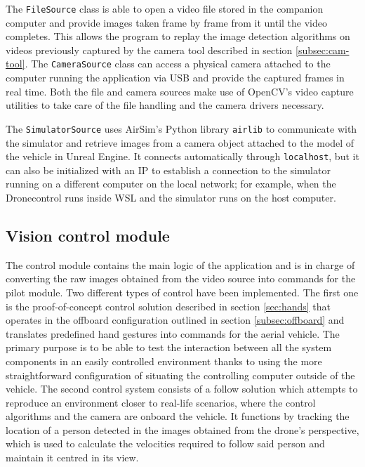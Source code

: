 The \texttt{FileSource} class is able to open a video file stored in the companion computer and provide images taken frame by frame from it until the video completes.
This allows the program to replay the image detection algorithms on videos previously captured by the camera tool described in section \ref{subsec:cam-tool}.
The \texttt{CameraSource} class can access a physical camera attached to the computer running the application via USB and provide the captured frames in real time.
Both the file and camera sources make use of OpenCV's video capture utilities to take care of the file handling and the camera drivers necessary.

The \texttt{SimulatorSource} uses AirSim's Python library \texttt{airlib} to communicate with the simulator and retrieve images from a camera object attached to the model of the vehicle in Unreal Engine.
It connects automatically through \texttt{localhost}, but it can also be initialized with an IP to establish a connection to the simulator running on a different computer on the local network; for example, when the Dronecontrol runs inside WSL and the simulator runs on the host computer.

\subsection{Vision control module}
\label{subsec:control-module}
The control module contains the main logic of the application and is in charge of converting the raw images obtained from the video source into commands for the pilot module.
Two different types of control have been implemented.
The first one is the proof-of-concept control solution described in section \ref{sec:hands} that operates in the offboard configuration outlined in section \ref{subsec:offboard} and translates predefined hand gestures into commands for the aerial vehicle.
The primary purpose is to be able to test the interaction between all the system components in an easily controlled environment thanks to using the more straightforward configuration of situating the controlling computer outside of the vehicle.
The second control system consists of a follow solution which attempts to reproduce an environment closer to real-life scenarios, where the control algorithms and the camera are onboard the vehicle.
It functions by tracking the location of a person detected in the images obtained from the drone's perspective, which is used to calculate the velocities required to follow said person and maintain it centred in its view.

